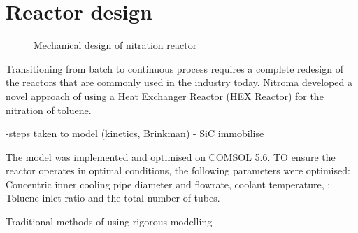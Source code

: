 \section*{Reactor design}
\begin{figure}[h]
    \centering
    \caption{Mechanical design of nitration reactor}
    \label{fig:comsol-S4-CW-X-T}
\end{figure}

Transitioning from batch to continuous process requires a complete redesign of the reactors that are commonly used in the industry today. Nitroma developed a novel approach of using a Heat Exchanger Reactor (HEX Reactor) for the nitration of toluene.

-steps taken to model (kinetics, Brinkman) 
- SiC immobilise

The model was implemented and optimised on COMSOL 5.6. TO ensure the reactor operates in optimal conditions, the following parameters were optimised: Concentric inner cooling pipe diameter and flowrate, coolant temperature,  : Toluene inlet ratio and the total number of tubes.

Traditional methods of using 
rigorous modelling

